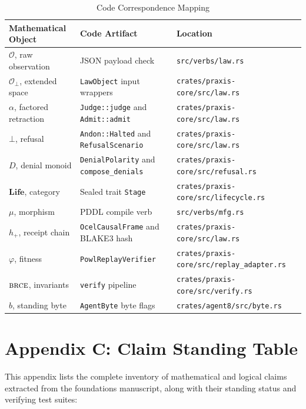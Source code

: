 \documentclass[11pt,oneside]{book}
\theoremstyle{definition}
\theoremstyle{plain}
\theoremstyle{remark}
\newcommand{\Obs}{\mathcal{O}}                 %
\newcommand{\Obsbot}{\Obs_{\bot}}             %
\newcommand{\muop}{\mu}                        %
\newcommand{\adm}{\alpha}                      %
\newcommand{\Rfsl}{\bot}                        %
\newcommand{\Fitness}{\varphi}
\newcommand{\Life}{\mathbf{Life}}
\newcommand{\BRCE}{\textsc{brce}}
\newcommand{\code}[1]{\texttt{#1}}
\begin{document}
\begin{table}[h]
\centering
\begin{tabular}{lll}
\toprule
Mathematical Object & Code Artifact & Location \\
\midrule
$\Obs$, raw observation & JSON payload check & \code{src/verbs/law.rs} \\
$\Obsbot$, extended space & \code{LawObject} input wrappers & \code{crates/praxis-core/src/law.rs} \\
$\adm$, factored retraction & \code{Judge::judge} and \code{Admit::admit} & \code{crates/praxis-core/src/law.rs} \\
$\Rfsl$, refusal & \code{Andon::Halted} and \code{RefusalScenario} & \code{crates/praxis-core/src/law.rs} \\
$D$, denial monoid & \code{DenialPolarity} and \code{compose\_denials} & \code{crates/praxis-core/src/refusal.rs} \\
$\Life$, category & Sealed trait \code{Stage} & \code{crates/praxis-core/src/lifecycle.rs} \\
$\muop$, morphism & PDDL compile verb & \code{src/verbs/mfg.rs} \\
$h_+$, receipt chain & \code{OcelCausalFrame} and BLAKE3 hash & \code{crates/praxis-core/src/law.rs} \\
$\Fitness$, fitness & \code{PowlReplayVerifier} & \code{crates/praxis-core/src/replay\_adapter.rs} \\
$\BRCE$, invariants & \code{verify} pipeline & \code{crates/praxis-core/src/verify.rs} \\
$b$, standing byte & \code{AgentByte} byte flags & \code{crates/agent8/src/byte.rs} \\
\bottomrule
\end{tabular}
\caption{Code Correspondence Mapping}
\label{tab:code_corr}
\end{table}

\chapter{Appendix C: Claim Standing Table}
\label{app:claims}

This appendix lists the complete inventory of mathematical and logical claims extracted from the foundations manuscript, along with their standing status and verifying test suites: %
\end{document}
